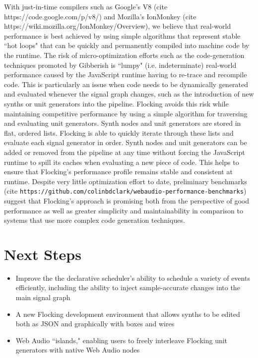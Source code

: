 \documentclass{article}
\begin{document}
With just-in-time compilers such as Google's V8 (cite https://code.google.com/p/v8/) and Mozilla's IonMonkey (cite https://wiki.mozilla.org/IonMonkey/Overview), we believe that real-world performance is best achieved by using simple algorithms that represent stable ``hot loops" that can be quickly and permanently  compiled into machine code by the runtime. The risk of micro-optimization efforts such as the code-generation techniques promoted by Gibberish is ``lumpy" (i.e. indeterminate) real-world performance caused by the JavaScript runtime having to re-trace and recompile code. This is particularly an issue when code needs to be dynamically generated and evaluated whenever the signal graph changes, such as the introduction of new synths or unit generators into the pipeline. Flocking avoids this risk while maintaining competitive performance by using a simple algorithm for traversing and evaluating unit generators. Synth nodes and unit generators are stored in flat, ordered lists. Flocking is able to quickly iterate through these lists and evaluate each signal generator in order. Synth nodes and unit generators can be added or removed from the pipeline at any time without forcing the JavaScript runtime to spill its caches when evaluating a new piece of code. This helps to ensure that Flocking's performance profile remains stable and consistent at runtime. Despite very little optimization effort to date, preliminary benchmarks (cite \verb|https://github.com/colinbdclark/webaudio-performance-benchmarks|) suggest that Flocking's approach is promising both from the perspective of good performance as well as greater simplicity and maintainability in comparison to systems that use more complex code generation techniques.

\section{Next Steps}

\begin{itemize}
  \item Improve the the declarative scheduler's ability to schedule a variety of events efficiently, including the ability to inject sample-accurate changes into the main signal graph
  \item A new Flocking development environment that allows synths to be edited both as JSON and graphically with boxes and wires
  \item Web Audio ``islands," enabling users to freely interleave Flocking unit generators with native Web Audio nodes
\end{itemize}
\end{document}
